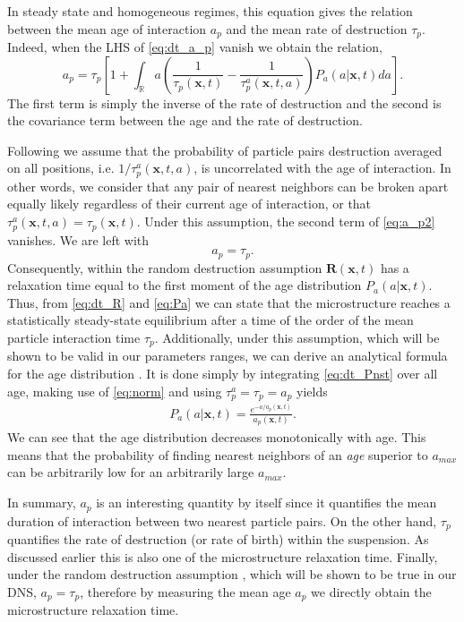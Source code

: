 In steady state and homogeneous regimes, this equation gives the relation between the mean age of interaction $a_p$ and the mean rate of destruction $\tau_p$. 
Indeed, when the LHS of \ref{eq:dt_a_p} vanish we obtain the relation,
\begin{equation}
    a_p
    = \tau_p \left[
        1
        + 
        \int_{\mathbb{R}} a\left(
            \frac{1}{\tau_p(\textbf{x},t)} 
            - \frac{1}{\tau_p^a(\textbf{x},t,a)} 
        \right) P_a(a|\textbf{x},t) da
    \right]. 
    \label{eq:a_p2}
\end{equation}
The first term is simply the inverse of the rate of destruction and the second is the covariance term between the age and the rate of destruction. 

Following \citep{zhang2023evolution} we assume that the probability of particle pairs destruction averaged on all positions, i.e. $1/\tau_p^a(\textbf{x},t,a)$, is uncorrelated with the age of interaction. 
In other words, we consider that any pair of nearest neighbors can be broken apart equally likely regardless of their current age of interaction, or that $\tau^a_p(\textbf{x},t,a) = \tau_p(\textbf{x},t)$.
Under this assumption, the second term of \ref{eq:a_p2} vanishes. 
We are left with
\begin{equation}
    a_p = \tau_p. 
    \label{eq:a_p_eq_tau_p}
\end{equation}
Consequently, within the random destruction assumption $\textbf{R}(\textbf{x},t)$ has a relaxation time equal to the first moment of the age distribution $P_a(a|\textbf{x},t)$. 
Thus, from \ref{eq:dt_R} and \ref{eq:Pa} we can state that the microstructure reaches a statistically steady-state equilibrium after a time of the order of the mean particle interaction time $\tau_p$. 
Additionally,  under this assumption, which will be shown to be valid in our parameters ranges, we can derive an analytical formula for the age distribution \citep{zhang2023evolution}. 
It is done simply by integrating \ref{eq:dt_Pnst} over all age, making use of \ref{eq:norm} and using $\tau_p^a = \tau_p = a_p$ yields
\begin{align}
    P_a(a|\textbf{x},t)  
    =\frac{e^{-a/a_p(\textbf{x},t)}}{a_p(\textbf{x},t)}.
    \label{eq:Pa}
\end{align} 
We can see that the age distribution decreases monotonically with age. 
This means that the probability of finding nearest neighbors of an \textit{age} superior to $a_{max}$ can be arbitrarily low for an arbitrarily large $a_{max}$. 

In summary, $a_p$ is an interesting quantity by itself since it quantifies the mean duration of interaction between two nearest particle pairs.
On the other hand, $\tau_p$ quantifies the rate of destruction (or rate of birth) within the suspension.
As discussed earlier this is also one of the microstructure relaxation time. 
Finally, under the random destruction assumption \citep{zhang2023evolution}, which will be shown to be true in our DNS, $a_p  =\tau_p$, therefore by measuring the mean age $a_p$ we directly obtain the microstructure relaxation time. 
 
